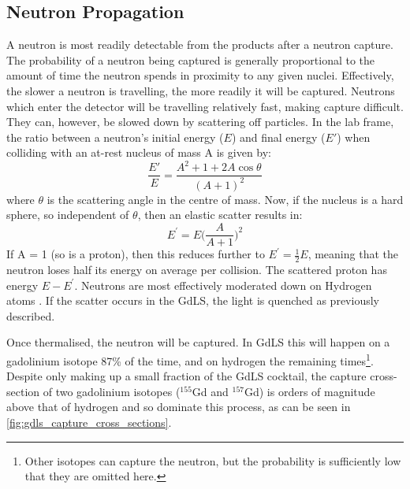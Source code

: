 

\subsection{Neutron Propagation}
\par
A neutron is most readily detectable from the products after a neutron capture.
The probability of a neutron being captured is generally proportional to the amount of time the neutron spends in proximity to any given nuclei.
Effectively, the slower a neutron is travelling, the more readily it will be captured.
Neutrons which enter the detector will be travelling relatively fast, making capture difficult.
They can, however, be slowed down by scattering off particles.
In the lab frame, the ratio between a neutron's initial energy ($E$) and final energy ($E'$) when colliding with an at-rest nucleus of mass A is given by:
\begin{equation}
    \frac{E'}{E} = \frac{A^2 + 1 + 2A\cos{\theta}}{(A + 1)^2}
\end{equation}
where $\theta$ is the scattering angle in the centre of mass.
Now, if the nucleus is a hard sphere, so independent of $\theta$, then an elastic scatter results in:
\begin{equation}
    E^{'} = E\bigg(\frac{A}{A+1}\bigg)^{2}
\end{equation}
If A = 1 (so is a proton), then this reduces further to $E^{'} = \frac{1}{2}E$, meaning that the neutron loses half its energy on average per collision.
The scattered proton has energy $E - E^{'}$.
Neutrons are most effectively moderated down on Hydrogen atoms \cite{neutron_thermalisation_and_capture_ref}.
If the scatter occurs in the GdLS, the light is quenched as previously described.
\par
Once thermalised, the neutron will be captured.
In GdLS this will happen on a gadolinium isotope 87\% of the time, and on hydrogen the remaining times\footnote{Other isotopes can capture the neutron, but the probability is sufficiently low that they are omitted here.}.
Despite only making up a small fraction of the GdLS cocktail, the capture cross-section of two gadolinium isotopes (${}^{155}$Gd and ${}^{157}$Gd) is orders of magnitude above that of hydrogen and so dominate this process, as can be seen in \autoref{fig:gdls_capture_cross_sections}.



